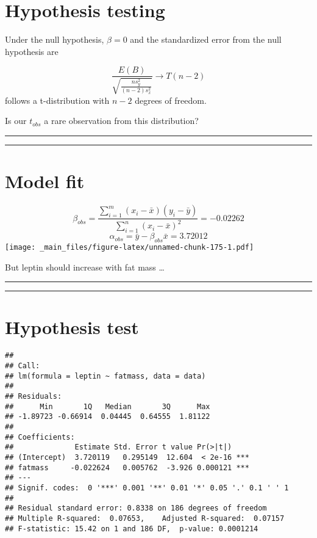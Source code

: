 \documentclass[
]{book}
\begin{document}
\hypertarget{hypothesis-testing-6}{%
\section{Hypothesis testing}\label{hypothesis-testing-6}}

Under the null hypothesis, \(\beta=0\) and the standardized error from the null hypothesis are

\[\frac{E(B)}{\sqrt{\frac{ns^2_y}{{(n-2)s^2_x}}}} \rightarrow T(n-2)\]
follows a t-distribution with \(n-2\) degrees of freedom.

Is our \(t_{obs}\) a rare observation from this distribution?

\begin{center}\rule{0.5\linewidth}{0.5pt}\end{center}

\begin{center}\rule{0.5\linewidth}{0.5pt}\end{center}

\hypertarget{model-fit}{%
\section{Model fit}\label{model-fit}}

\[\beta_{obs}= \frac{\sum_{i=1}^m(x_i-\bar{x})(y_i-\bar{y})}{\sum_{i=1}^n(x_i-\bar{x})^2}= -0.02262\]
\[\alpha_{obs}=\bar{y}-\beta_{obs}\bar{x}= 3.72012\]
\texttt{[image: \_main\_files/figure-latex/unnamed-chunk-175-1.pdf]}

But leptin should increase with fat mass \ldots{}

\begin{center}\rule{0.5\linewidth}{0.5pt}\end{center}

\begin{center}\rule{0.5\linewidth}{0.5pt}\end{center}

\hypertarget{hypothesis-test}{%
\section{Hypothesis test}\label{hypothesis-test}}

\begin{verbatim}
## 
## Call:
## lm(formula = leptin ~ fatmass, data = data)
## 
## Residuals:
##      Min       1Q   Median       3Q      Max 
## -1.89723 -0.66914  0.04445  0.64555  1.81122 
## 
## Coefficients:
##              Estimate Std. Error t value Pr(>|t|)    
## (Intercept)  3.720119   0.295149  12.604  < 2e-16 ***
## fatmass     -0.022624   0.005762  -3.926 0.000121 ***
## ---
## Signif. codes:  0 '***' 0.001 '**' 0.01 '*' 0.05 '.' 0.1 ' ' 1
## 
## Residual standard error: 0.8338 on 186 degrees of freedom
## Multiple R-squared:  0.07653,    Adjusted R-squared:  0.07157 
## F-statistic: 15.42 on 1 and 186 DF,  p-value: 0.0001214
\end{verbatim}
\end{document}
